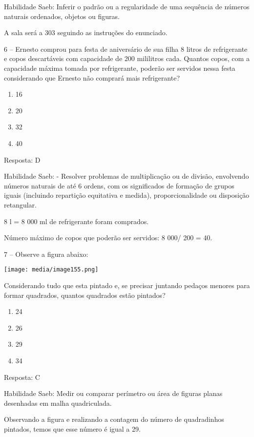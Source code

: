 Habilidade Saeb: Inferir o padrão ou a regularidade de uma sequência de
números naturais ordenados, objetos ou figuras.

A sala será a 303 seguindo as instruções do enunciado.

6 -- Ernesto comprou para festa de aniversário de sua filha 8 litros de
refrigerante e copos descartáveis com capacidade de 200 mililitros cada.
Quantos copos, com a capacidade máxima tomada por refrigerante, poderão
ser servidos nessa festa considerando que Ernesto não comprará mais
refrigerante?

\begin{enumerate}
\def\labelenumi{\alph{enumi})}
\item
  16
\item
  20
\item
  32
\item
  40
\end{enumerate}

Resposta: D

Habilidade Saeb: - Resolver problemas de multiplicação ou de divisão,
envolvendo números naturais de até 6 ordens, com os significados de
formação de grupos iguais (incluindo repartição equitativa e medida),
proporcionalidade ou disposição retangular.

8 l = 8 000 ml de refrigerante foram comprados.

Número máximo de copos que poderão ser servidos: 8 000/ 200 = 40.

7 -- Observe a figura abaixo:

\texttt{[image: media/image155.png]}

Considerando tudo que esta pintado e, se precisar juntando pedaços
menores para formar quadrados, quantos quadrados estão pintados?

\begin{enumerate}
\def\labelenumi{\alph{enumi})}
\item
  24
\item
  26
\item
  29
\item
  34
\end{enumerate}

Resposta: C

Habilidade Saeb: Medir ou comparar perímetro ou área de figuras planas
desenhadas em malha quadriculada.

Observando a figura e realizando a contagem do número de quadradinhos
pintados, temos que esse número é igual a 29.

